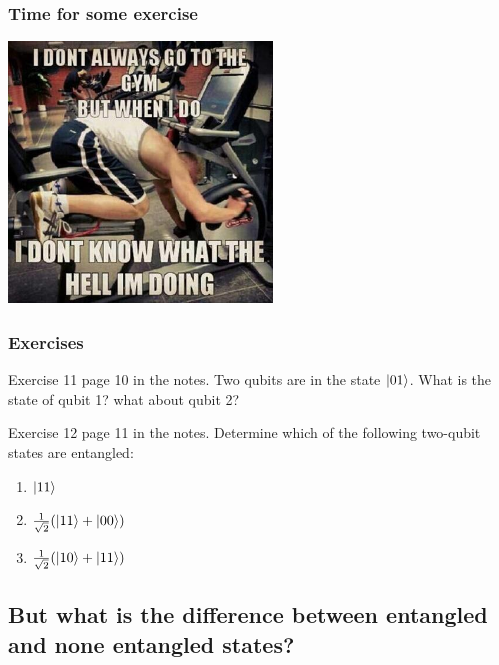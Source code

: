 \documentclass[10pt]{beamer}
\begin{document}
\begin{frame}
  \frametitle{Time for some exercise}
  \centering
  \includegraphics[width=7cm]{img/exercise-meme.jpg}
\end{frame}

\begin{frame}
  \frametitle{Exercises}
  \begin{block}{Exercise 11 page 10 in the notes.}
    Two qubits are in the state $\ket{01}$. What is the state of  qubit 1? what about qubit 2?
  \end{block}
  \begin{block}{Exercise 12 page 11 in the notes.}
    Determine which of the following two-qubit states are entangled: 
         \begin{enumerate}
             \item $\ket{11}$
             \item $\frac{1}{\sqrt{2}}(\ket{11}+\ket{00})$
             \item $\frac{1}{\sqrt{2}}(\ket{10}+\ket{11})$ 
         \end{enumerate}
  \end{block}
\end{frame}

\begin{frame}
 \section{But what is the difference between entangled and none entangled states?}
\end{frame}
\end{document}
